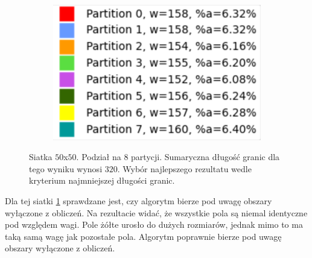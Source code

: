 \begin{figure}[h]
\begin{subfigure}{.33\textwidth}
    \caption[short]{}
\end{subfigure}%
\begin{subfigure}{.33\textwidth}
    \centering
    \includegraphics[width=0.9\linewidth]{images/results/m_k/with/4/results}
    \caption[short]{}
\end{subfigure}
\caption{Siatka $50$x$50$. Podział na $8$ partycji. Sumaryczna długość granic dla tego wyniku wynosi $320$.
Wybór najlepszego rezultatu wedle kryterium najmniejszej długości granic.}
\label{result:4}
\end{figure}

Dla tej siatki \ref{result:4} sprawdzane jest, czy algorytm bierze pod uwagę obszary wyłączone z obliczeń.
Na rezultacie widać, że wszystkie pola są niemal identyczne pod względem wagi.
Pole żółte urosło do dużych rozmiarów, jednak mimo to ma taką samą wagę jak pozostałe pola.
Algorytm poprawnie bierze pod uwagę obszary wyłączone z obliczeń.


